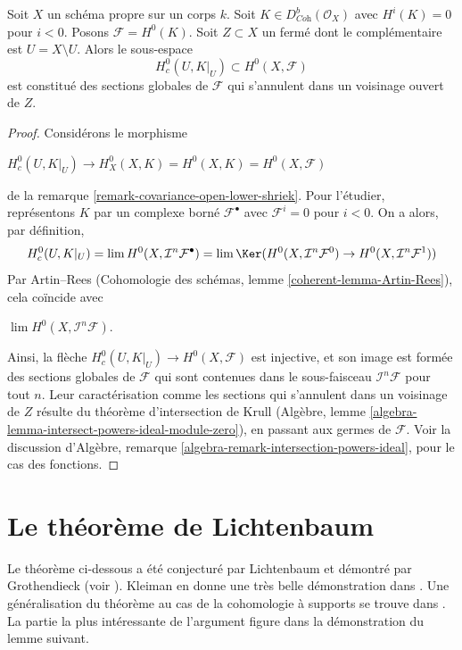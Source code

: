 \begin{lemma}
\label{lemma-h0-compactly-supported}
Soit $X$ un schéma propre sur un corps $k$. Soit $K \in D^b_{\textit{Coh}}(\mathcal{O}_X)$ avec $H^i(K) = 0$ pour $i < 0$. Posons $\mathcal{F} = H^0(K)$. Soit $Z \subset X$ un fermé dont le complémentaire est $U = X \setminus U$. Alors le sous-espace
$$
H^0_c(U, K|_U) \subset H^0(X, \mathcal{F})
$$
est constitué des sections globales de $\mathcal{F}$ qui s'annulent dans un voisinage ouvert de $Z$.
\end{lemma}

\begin{proof}
Considérons le morphisme
\par\noindent\hfil
$H^0_c(U, K|_U) \to H^0_X(X, K) = H^0(X, K) = H^0(X, \mathcal{F})$
\hfil\par\noindent
de la remarque \ref{remark-covariance-open-lower-shriek}. Pour l'étudier, représentons $K$ par un complexe borné $\mathcal{F}^\bullet$ avec $\mathcal{F}^i = 0$ pour $i < 0$. On a alors, par définition,
$$
H^0_c(U, K|_U) = \lim H^0(X, \mathcal{I}^n\mathcal{F}^\bullet)
= \lim \Ker(
H^0(X, \mathcal{I}^n\mathcal{F}^0) \to
H^0(X, \mathcal{I}^n\mathcal{F}^1))
$$
Par Artin–Rees (Cohomologie des schémas, lemme \ref{coherent-lemma-Artin-Rees}), cela coïncide avec
\par\noindent\hfil
$\lim H^0(X, \mathcal{I}^n\mathcal{F})$.
\hfil\par\noindent
Ainsi, la flèche $H^0_c(U, K|_U) \to H^0(X, \mathcal{F})$ est injective, et son image est formée des sections globales de $\mathcal{F}$ qui sont contenues dans le sous-faisceau $\mathcal{I}^n\mathcal{F}$ pour tout $n$. Leur caractérisation comme les sections qui s'annulent dans un voisinage de $Z$ résulte du théorème d'intersection de Krull (Algèbre, lemme \ref{algebra-lemma-intersect-powers-ideal-module-zero}), en passant aux germes de $\mathcal{F}$. Voir la discussion d'Algèbre, remarque \ref{algebra-remark-intersection-powers-ideal}, pour le cas des fonctions.
\end{proof}




\section{Le théorème de Lichtenbaum}
\label{section-lichtenbaum}

\noindent
Le théorème ci-dessous a été conjecturé par Lichtenbaum et démontré par Grothendieck (voir \cite{Hartshorne-local-cohomology}). Kleiman en donne une très belle démonstration dans \cite{Kleiman-Lichtenbaum}. Une généralisation du théorème au cas de la cohomologie à supports se trouve dans \cite{Lyubeznik-Lichtenbaum}. La partie la plus intéressante de l'argument figure dans la démonstration du lemme suivant.

